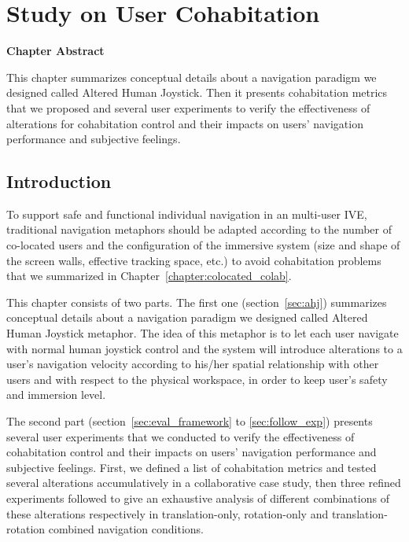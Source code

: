 \chapter{Study on User Cohabitation}
\label{chapter:user_cohab}
\pagebreak

\textbf{Chapter Abstract}

This chapter summarizes conceptual details about a navigation paradigm we designed called Altered Human Joystick. Then it presents cohabitation metrics that we proposed and several user experiments to verify the effectiveness of alterations for cohabitation control and their impacts on users' navigation performance and subjective feelings.

\vspace*{2\baselineskip}

\minitoc

\newpage
\section{Introduction}
To support safe and functional individual navigation in an multi-user IVE, traditional navigation metaphors should be adapted according to the number of co-located users and the configuration of the immersive system (size and shape of the screen walls, effective tracking space, etc.) to avoid cohabitation problems that we summarized in Chapter~\ref{chapter:colocated_colab}.

This chapter consists of two parts. The first one (section~\ref{sec:ahj}) summarizes conceptual details about a navigation paradigm we designed called Altered Human Joystick metaphor. The idea of this metaphor is to let each user navigate with normal human joystick control and the system will introduce alterations to a user's navigation velocity according to his/her spatial relationship with other users and with respect to the physical workspace, in order to keep user's safety and immersion level.

The second part (section~\ref{sec:eval_framework} to \ref{sec:follow_exp}) presents several user experiments that we conducted to verify the effectiveness of cohabitation control and their impacts on users' navigation performance and subjective feelings. First, we defined a list of cohabitation metrics and tested several alterations accumulatively in a collaborative case study, then three refined experiments followed to give an exhaustive analysis of different combinations of these alterations respectively in translation-only, rotation-only and translation-rotation combined navigation conditions.


